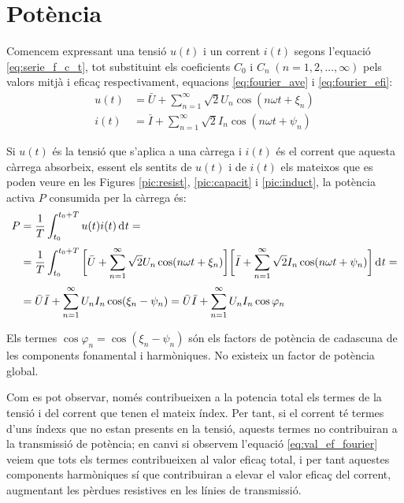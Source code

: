 \section{Potència}

Comencem expressant una tensió $u(t)$ i un corrent $i(t)$
 segons l'equació \eqref{eq:serie_f_c_t}, tot substituint els
 coeficients $C_0$ i $C_n \;(n=1,2,\ldots,\infty)$ pels valors mitjà i eficaç
 respectivament, equacions \eqref{eq:fourier_ave} i \eqref{eq:fourier_efi}:
 \begin{align}
    u(t)  &= \bar{U} + \sum_{n=1}^\infty \sqrt{2} U_n \cos (n \omega t +
    \xi_n)\\[0.5ex]
    i(t)  &= \bar{I} + \sum_{n=1}^\infty \sqrt{2} I_n \cos (n \omega t + \psi_n)
 \end{align}

Si  $u(t)$ és la tensió que s'aplica a una càrrega i $i(t)$ és el
corrent que aquesta càrrega absorbeix, essent els sentits de $u(t)$
i de $i(t)$ els mateixos que es poden veure en les Figures
\ref{pic:resist}, \ref{pic:capacit} i \ref{pic:induct}, la potència
activa $P$ consumida per la càrrega és:
\begin{equation}\begin{split}
    P &= \frac{1}{T} \int_{t_0}^{t_0+T} u(t) i(t) \diff t =
    \\[0.5ex]
     &= \frac{1}{T} \int_{t_0}^{t_0+T} \bigg[\bar{U} + \sum_{n=1}^\infty
    \sqrt{2} U_n \cos (n \omega t + \xi_n) \bigg]
    \bigg[\bar{I} + \sum_{n=1}^\infty \sqrt{2} I_n
    \cos (n \omega t + \psi_n)\bigg] \diff t=\\[0.5ex]
    &=\bar{U} \bar{I} + \sum_{n=1}^\infty U_n I_n
    \cos(\xi_n-\psi_n) = \bar{U} \bar{I} + \sum_{n=1}^\infty U_n I_n
    \cos \varphi_n \label{eq:pot_fu}
\end{split}\end{equation}

Els termes $\cos \varphi_n=\cos (\xi_n-\psi_n)$ són els factors de
potència de cadascuna de les components fonamental i harmòniques. No
existeix un factor de potència global.

 Com es pot observar, només contribueixen a la potencia
total els termes de la tensió i del corrent que tenen el mateix
índex. Per tant, si el corrent té termes d'uns índexs que no estan
presents en la tensió, aquests termes no contribuiran a la
transmissió de  potència; en canvi si observem l'equació
\eqref{eq:val_ef_fourier} veiem que tots els termes contribueixen al
valor eficaç total, i per tant aquestes components harmòniques sí que
contribuiran a elevar el valor eficaç del corrent, augmentant
 les pèrdues resistives en les línies de transmissió.

